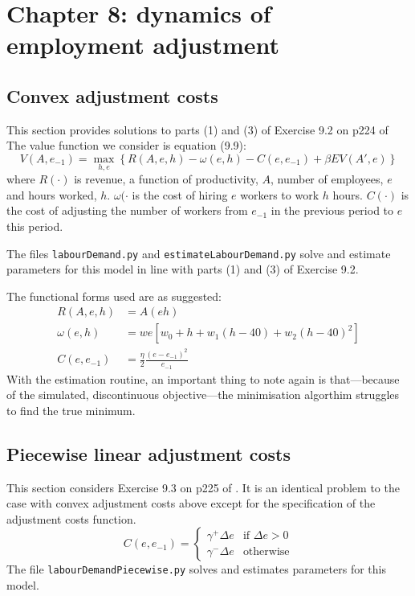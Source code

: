 \section{Chapter 8: dynamics of employment adjustment}

\subsection{Convex adjustment costs} \label{sub:demandconvex}

This section provides solutions to parts (1) and (3) of Exercise 9.2 on p224 \citet{adda2003dynamic} of The value function we consider is equation (9.9):
%
\begin{equation}
	V(A, e_{-1}) = \max_{h,e} \left\{ R(A,e,h) - \omega(e,h) - C(e,e_{-1}) + \beta EV(A', e) \right\}
\end{equation}
%
where \(R(\cdot)\) is revenue, a function of productivity, \(A\), number of employees, \(e\) and hours worked, \(h\). \(\omega(\cdot\) is the cost of hiring \(e\) workers to work \(h\) hours. \(C(\cdot)\) is the cost of adjusting the number of workers from \(e_{-1}\) in the previous period to \(e\) this period.

The files \texttt{labourDemand.py} and \texttt{estimateLabourDemand.py} solve and estimate parameters for this model in line with parts (1) and (3) of Exercise 9.2.

The functional forms used are as suggested:
%
\begin{align}
 R(A,e,h) &=  A(eh) \\
 \omega(e,h) &= we\left[w_0 + h + w_1(h - 40) + w_2(h - 40)^2\right] \\
 C(e,e_{-1}) &= \frac{\eta}{2}\frac{(e - e_{-1})^2}{e_{-1}}
\end{align}
%
With the estimation routine, an important thing to note again is that---because of the simulated, discontinuous objective---the minimisation algorthim struggles to find the true minimum.

\subsection{Piecewise linear adjustment costs}

This section considers Exercise 9.3 on p225 of \citet{adda2003dynamic}. It is an identical problem to the case with convex adjustment costs above except for the specification of the adjustment costs function.
%
\begin{equation}
  C(e,e_{-1})=\begin{cases}
    \gamma^{+}\Delta e & \text{if $\Delta e > 0$}\\
    \gamma^{-}\Delta e & \text{otherwise}
  \end{cases}
\end{equation}
%
The file \texttt{labourDemandPiecewise.py} solves and estimates parameters for this model.

